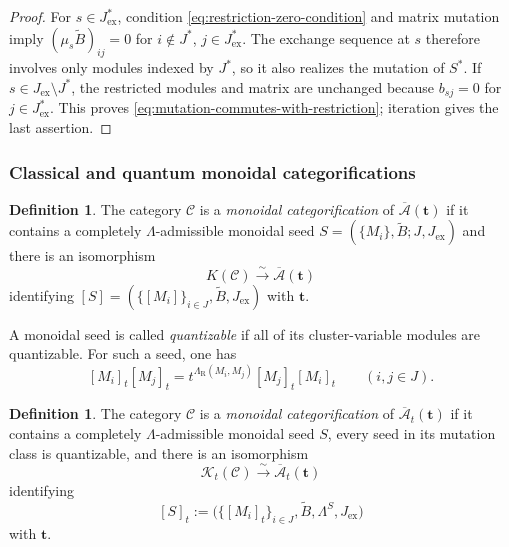 \documentclass[12pt, reqno]{amsart}
\theoremstyle{plain}
\theoremstyle{definition}
\newtheorem{definition}[theorem]{Definition}
\numberwithin{equation}{section}
\newcommand{\LambdaR}{\Lambda_{\mathrm R}}
\begin{document}
\begin{proof}
For \(s\in J_{\mathrm{ex}}^*\), condition
\eqref{eq:restriction-zero-condition} and matrix mutation imply
\((\mu_s\widetilde B)_{ij}=0\) for
\(i\notin J^*\), \(j\in J_{\mathrm{ex}}^*\). The exchange sequence at
\(s\) therefore involves only modules indexed by \(J^*\), so it also
realizes the mutation of \(S^*\). If
\(s\in J_{\mathrm{ex}}\setminus J^*\), the restricted modules and
matrix are unchanged because \(b_{sj}=0\) for
\(j\in J_{\mathrm{ex}}^*\). This proves
\eqref{eq:mutation-commutes-with-restriction}; iteration gives the last
assertion.
\end{proof}

\subsubsection{Classical and quantum monoidal categorifications}

\begin{definition}\label{def:classical-monoidal-categorification}
The category \(\mathscr C\) is a \emph{monoidal categorification} of
\(\overline{\mathcal A}(\mathbf t)\) if it contains a completely
\(\Lambda\)-admissible monoidal seed
\(S=(\{M_i\},\widetilde B;J,J_{\mathrm{ex}})\) and there is an
isomorphism
\[
    K(\mathscr C)\xrightarrow{\sim}
    \overline{\mathcal A}(\mathbf t)
\]
identifying
\(
    [S]=(\{[M_i]\}_{i\in J},\widetilde B,J_{\mathrm{ex}})
\)
with \(\mathbf t\).
\end{definition}

A monoidal seed is called \emph{quantizable} if all of its
cluster-variable modules are quantizable. For such a seed, one has
\begin{equation}\label{eq:quantum-classes-commutation}
    [M_i]_t[M_j]_t
    =t^{\LambdaR(M_i,M_j)}[M_j]_t[M_i]_t
    \qquad (i,j\in J).
\end{equation}

\begin{definition}\label{def:quantum-monoidal-categorification}
The category \(\mathscr C\) is a \emph{monoidal categorification} of
\(\overline{\mathcal A}_t(\mathbf t)\) if it contains a completely
\(\Lambda\)-admissible monoidal seed \(S\), every seed in its mutation
class is quantizable, and there is an isomorphism
\[
    \mathcal K_t(\mathscr C)\xrightarrow{\sim}
    \overline{\mathcal A}_t(\mathbf t)
\]
identifying
\begin{equation}\label{eq:quantum-seed-from-monoidal-seed}
    [S]_t
    :=\bigl(\{[M_i]_t\}_{i\in J},\widetilde B,
             \Lambda^S,J_{\mathrm{ex}}\bigr)
\end{equation}
with \(\mathbf t\).
\end{definition}
\end{document}
